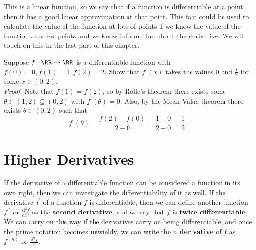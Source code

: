 \documentclass[../real_analysis.tex]{subfiles}
\begin{document}
            This is a linear function, so we say that if a function is differentiable at a point then it has a good linear approximation at that point. This fact could be used to calculate the value of the function at lots of points if we know the value of the function at a few points and we know information about the derivative. We will touch on this in the last part of this chapter.
            \begin{example}
                Suppose $f:\RR\to\RR$ is a differentiable function with $f(0)=0,f(1)=1,f(2)=2$. Show that $f^\prime(x)$ takes the values 0 and $\frac{1}{2}$ for some $x\in(0,2)$.\\
                \textit{Proof}: Note that $f(1)=f(2)$, so by Rolle's theorem there exists some $\theta\in(1,2)\subseteq(0,2)$ with $f^\prime(\theta)=0$. Also, by the Mean Value theorem there exists $\theta\in(0,2)$ such that
                \begin{equation}
                    f^\prime(\theta)=\frac{f(2)-f(0)}{2-0}=\frac{1-0}{2-0}=\frac{1}{2}.
                \end{equation}
            \end{example}

    \section{Higher Derivatives}\label{sec:higher-derivatives}
        If the derivative of a differentiable function can be considered a function in its own right, then we can investigate the differentiability of it as well.
        If the derivative $f^\prime$ of a function $f$ is differentiable, then we can define another function $f^{\prime\prime}$ or $\frac{\mathrm{d}^2f}{\mathrm{d}x^2}$ as the \textbf{second derivative}, and we say that $f$ is \textbf{twice differentiable}.
        We can carry on this way if the derivatives carry on being differentiable, and once the prime notation becomes unwieldy, we can write the $n$ \textbf{derivative} of $f$ as $f^{(n)}$ or $\frac{\mathrm{d}^nf}{\mathrm{d}x^n}$.
        
\end{document}
